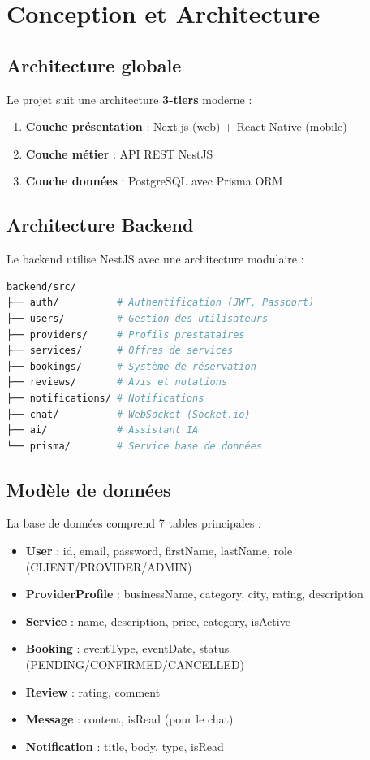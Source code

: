 \documentclass[12pt,a4paper]{report}
\begin{document}
\chapter{Conception et Architecture}

\section{Architecture globale}
Le projet suit une architecture \textbf{3-tiers} moderne :

\begin{enumerate}
  \item \textbf{Couche présentation} : Next.js (web) + React Native (mobile)
  \item \textbf{Couche métier} : API REST NestJS
  \item \textbf{Couche données} : PostgreSQL avec Prisma ORM
\end{enumerate}

\section{Architecture Backend}
Le backend utilise NestJS avec une architecture modulaire :

\begin{lstlisting}[language=bash, caption=Structure des modules NestJS]
backend/src/
├── auth/          # Authentification (JWT, Passport)
├── users/         # Gestion des utilisateurs
├── providers/     # Profils prestataires
├── services/      # Offres de services
├── bookings/      # Système de réservation
├── reviews/       # Avis et notations
├── notifications/ # Notifications
├── chat/          # WebSocket (Socket.io)
├── ai/            # Assistant IA
└── prisma/        # Service base de données
\end{lstlisting}

\section{Modèle de données}
La base de données comprend 7 tables principales :

\begin{itemize}
  \item \textbf{User} : id, email, password, firstName, lastName, role (CLIENT/PROVIDER/ADMIN)
  \item \textbf{ProviderProfile} : businessName, category, city, rating, description
  \item \textbf{Service} : name, description, price, category, isActive
  \item \textbf{Booking} : eventType, eventDate, status (PENDING/CONFIRMED/CANCELLED)
  \item \textbf{Review} : rating, comment
  \item \textbf{Message} : content, isRead (pour le chat)
  \item \textbf{Notification} : title, body, type, isRead
\end{itemize}
\end{document}

